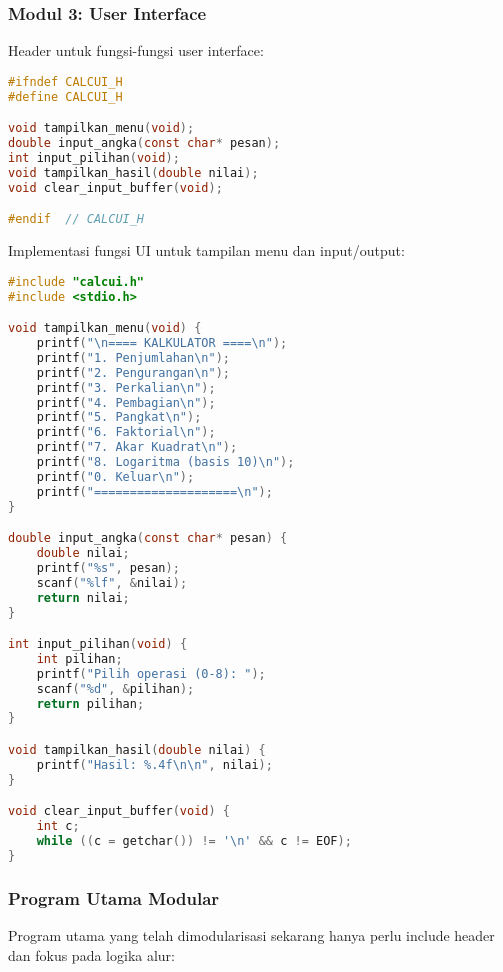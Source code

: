 \documentclass[../main.tex]{subfiles}
\begin{document}
\subsubsection{Modul 3: User Interface}

Header untuk fungsi-fungsi user interface:

\begin{lstlisting}[language=C, caption={calcui.h - header antarmuka pengguna}]
#ifndef CALCUI_H
#define CALCUI_H

void tampilkan_menu(void);
double input_angka(const char* pesan);
int input_pilihan(void);
void tampilkan_hasil(double nilai);
void clear_input_buffer(void);

#endif  // CALCUI_H
\end{lstlisting}

Implementasi fungsi UI untuk tampilan menu dan input/output:

\begin{lstlisting}[language=C, caption={calcui.c - implementasi UI}]
#include "calcui.h"
#include <stdio.h>

void tampilkan_menu(void) {
    printf("\n==== KALKULATOR ====\n");
    printf("1. Penjumlahan\n");
    printf("2. Pengurangan\n");
    printf("3. Perkalian\n");
    printf("4. Pembagian\n");
    printf("5. Pangkat\n");
    printf("6. Faktorial\n");
    printf("7. Akar Kuadrat\n");
    printf("8. Logaritma (basis 10)\n");
    printf("0. Keluar\n");
    printf("====================\n");
}

double input_angka(const char* pesan) {
    double nilai;
    printf("%s", pesan);
    scanf("%lf", &nilai);
    return nilai;
}

int input_pilihan(void) {
    int pilihan;
    printf("Pilih operasi (0-8): ");
    scanf("%d", &pilihan);
    return pilihan;
}

void tampilkan_hasil(double nilai) {
    printf("Hasil: %.4f\n\n", nilai);
}

void clear_input_buffer(void) {
    int c;
    while ((c = getchar()) != '\n' && c != EOF);
}
\end{lstlisting}

\subsubsection{Program Utama Modular}

Program utama yang telah dimodularisasi sekarang hanya perlu include header dan fokus pada logika alur:
\end{document}
